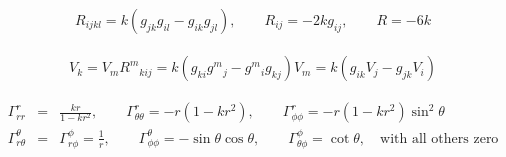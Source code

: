 \documentclass[10pt,letterpaper]{article}
\numberwithin{equation}{section}
\begin{document}
\begin{appendices}
\begin{eqnarray}
R_{ijkl} = k(g_{jk}g_{il}-g_{ik}g_{jl}),\qquad R_{ij} = -2kg_{ij},\qquad R = -6k
\end{eqnarray}

\begin{eqnarray}
[\nabla_i,\nabla_j]V_k = V_m R^m{}_{kij}= k (g_{ki}g^{m}{}_j - g^m{}_{i}g_{kj})V_m = k(g_{ik}V_j - g_{jk}V_i)
\label{covcom}
\end{eqnarray}

\begin{eqnarray}
\Gamma^r_{rr} &=& \frac{kr}{1-kr^2},\qquad \Gamma^r_{\theta\theta} = -r(1-kr^2),\qquad \Gamma^r_{\phi\phi} = -r(1-kr^2)\sin^2\theta
\nonumber\\
\Gamma^\theta_{r\theta} &=& \Gamma^{\phi}_{r\phi} = \frac{1}{r},\qquad \Gamma^{\theta}_{\phi\phi} = -\sin\theta\cos\theta, \qquad \Gamma^{\phi}_{\theta\phi} = \cot\theta,\quad\text{with all others zero}
\end{eqnarray}
 
\end{appendices}
\end{document}
